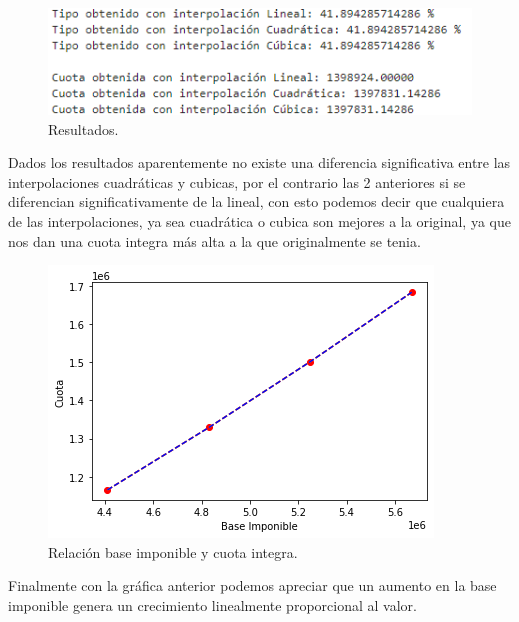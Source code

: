 \documentclass[10pt,letterpaper]{article}
\begin{document}
	\begin{figure}[H]
		\includegraphics[width=\textwidth]{Results}
		\caption{Resultados.}
		\centering
	\end{figure}	
	Dados los resultados aparentemente no existe una diferencia significativa entre las interpolaciones cuadráticas y cubicas, por el contrario las 2 anteriores si se diferencian significativamente de la lineal, con esto podemos decir que cualquiera de las interpolaciones, ya sea cuadrática o cubica son mejores a la original, ya que nos dan una cuota integra más alta a la que originalmente se  tenia. \\
	\begin{figure}[H]
		\includegraphics[width=\textwidth]{Grafica13}
		\caption{Relación base imponible y cuota integra.}
		\centering
	\end{figure}
	Finalmente con la gráfica anterior podemos apreciar que un aumento en la base imponible genera un crecimiento linealmente proporcional al valor.   
	
\end{document}
